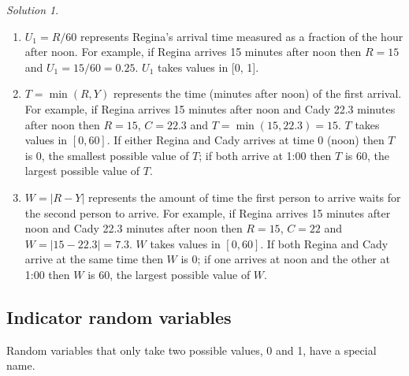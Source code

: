 \documentclass[
  letterpaper,
  DIV=11,
  numbers=noendperiod]{scrreprt}
\providecommand{\tightlist}{%
  \setlength{\itemsep}{0pt}\setlength{\parskip}{0pt}}
\theoremstyle{plain}
\theoremstyle{definition}
\theoremstyle{definition}
\theoremstyle{definition}
\theoremstyle{remark}
\newtheorem{refsolution}{Solution}[chapter]
\begin{document}
\begin{tcolorbox}[enhanced jigsaw, opacityback=0, rightrule=.15mm, coltitle=black, colframe=quarto-callout-tip-color-frame, toprule=.15mm, colbacktitle=quarto-callout-tip-color!10!white, opacitybacktitle=0.6, left=2mm, toptitle=1mm, breakable, title={Solution (click to expand)}, bottomtitle=1mm, colback=white, leftrule=.75mm, titlerule=0mm, arc=.35mm, bottomrule=.15mm]

\begin{refsolution}
\leavevmode

\begin{enumerate}
\def\labelenumi{\arabic{enumi}.}
\tightlist
\item
  \(U_1= R / 60\) represents Regina's arrival time measured as a
  fraction of the hour after noon. For example, if Regina arrives 15
  minutes after noon then \(R=15\) and \(U_1= 15/60 = 0.25\). \(U_1\)
  takes values in {[}0, 1{]}.
\item
  \(T=\min(R, Y)\) represents the time (minutes after noon) of the first
  arrival. For example, if Regina arrives 15 minutes after noon and Cady
  22.3 minutes after noon then \(R=15\), \(C=22.3\) and
  \(T=\min(15, 22.3) = 15\). \(T\) takes values in \([0, 60]\). If
  either Regina and Cady arrives at time 0 (noon) then \(T\) is 0, the
  smallest possible value of \(T\); if both arrive at 1:00 then \(T\) is
  60, the largest possible value of \(T\).
\item
  \(W=|R-Y|\) represents the amount of time the first person to arrive
  waits for the second person to arrive. For example, if Regina arrives
  15 minutes after noon and Cady 22.3 minutes after noon then \(R=15\),
  \(C=22\) and \(W = |15-22.3| = 7.3\). \(W\) takes values in
  \([0, 60]\). If both Regina and Cady arrive at the same time then
  \(W\) is 0; if one arrives at noon and the other at 1:00 then \(W\) is
  60, the largest possible value of \(W\).
\end{enumerate}

\label{sol-meeting-rv}

\end{refsolution}

\end{tcolorbox}

\subsection{Indicator random variables}\label{sec-indicator-rv}

Random variables that only take two possible values, 0 and 1, have a
special name.
\end{document}
